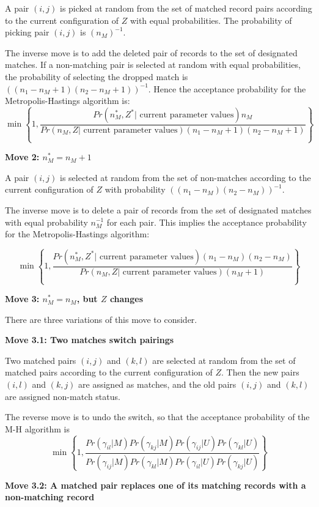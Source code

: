 \documentclass[11pt,reqno]{amsart}
\begin{document}
A pair $(i,j)$ is picked at random from the set of matched record pairs according to the current configuration of $Z$ with equal probabilities.  The probability of picking pair $(i,j)$ is $(n_M)^{-1}$. 

The inverse move is to add the deleted pair of records to the set of designated matches.  If a non-matching pair is selected at random with equal probabilities, the probability of selecting the dropped match is $\left((n_1 - n_M + 1)(n_2 - n_M + 1)\right)^{-1}$.  Hence the acceptance probability for the Metropolis-Hastings algorithm is:
\[ \min \left\{ 1, \frac{Pr\left(n_M^*, Z^* | \text{ current parameter values}\right)  n_M}{Pr\left(n_M, Z | \text{ current parameter values}\right) (n_1 - n_M + 1)(n_2 - n_M + 1)}\right\} \] 

\textbf{Move 2: $n_M^* = n_M + 1 $ }

A pair $(i,j)$ is selected at random from the set of non-matches according to the current configuration of $Z$ with probability $\left((n_1-n_M)(n_2-n_M)\right)^{-1}$.  

The inverse move is to delete a pair of records from the set of designated matches with equal probability $n_M^{-1}$ for each pair.  This implies the acceptance probability for the Metropolis-Hastings algorithm:

\[ \min \left\{ 1, \frac{Pr\left(n_M^*, Z^* | \text{ current parameter values}\right)(n_1 - n_M)(n_2 - n_M)}{Pr\left(n_M, Z | \text{ current parameter values}\right)(n_M + 1)} \right\} \] 

\textbf{Move 3: $n_M^* = n_M$, but $Z$ changes} 

There are three variations of this move to consider. 

\textbf{Move 3.1: Two matches switch pairings}

Two matched pairs $(i,j)$ and $(k, l)$ are selected at random from the set of matched pairs according to the current configuration of $Z$.   Then the new pairs $(i,l)$ and $(k,j)$ are assigned as matches, and the old pairs $(i,j)$ and $(k,l)$ are assigned non-match status. 

The reverse move is to undo the switch, so that the acceptance probability of the M-H algorithm is
\[ \min \left\{ 1, \frac{Pr(\gamma_{il} | M) Pr(\gamma_{kj} | M) Pr(\gamma_{ij} | U) Pr(\gamma_{kl} | U)}{Pr(\gamma_{ij} | M) Pr(\gamma_{kl} | M) Pr(\gamma_{il} | U) Pr(\gamma_{kj} | U)} \right\} \] 

\textbf{Move 3.2: A matched pair replaces one of its matching records with a non-matching record}
\end{document}
